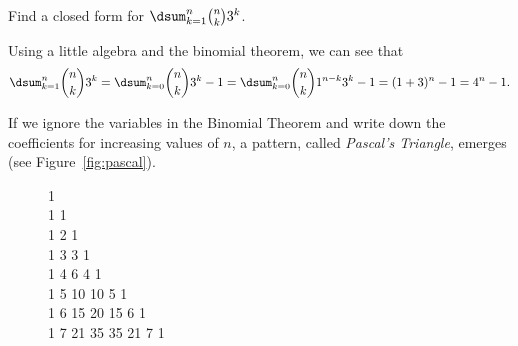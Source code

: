\begin{exer}
Find a closed form for $\dsum_{k=1}^{n} \binom{n}{k}3^k$.
\vspace*{2in}
\begin{answer}
Using a little algebra and the binomial theorem,  we can see that 
$$\dsum_{k=1}^{n} \binom{n}{k}3^k
=\dsum_{k=0}^{n} \binom{n}{k}3^{k}-1
=\dsum_{k=0}^{n} \binom{n}{k}1^{n-k}3^{k}-1
=(1+3)^{n}-1=4^n-1.$$
\end{answer}
\end{exer}

If we ignore the variables in the Binomial Theorem and write down the coefficients
for increasing values of $n$, a pattern, called {\em Pascal's Triangle}, emerges
(see Figure~\ref{fig:pascal}).

\begin{figure}[h]
\centering
\small{1 \\
1 \hspace{3mm} 1\\
1 \hspace{3mm} 2 \hspace{3mm} 1 \\
1 \hspace{3mm} 3 \hspace{3mm} 3 \hspace{3mm} 1 \\
1 \hspace{3mm} 4 \hspace{3mm} 6 \hspace{3mm} 4 \hspace{3mm} 1 \\
1 \hspace{3mm} 5 \hspace{3mm} 10 \hspace{3mm} 10 \hspace{3mm} 5 \hspace{3mm} 1 \\
1 \hspace{3mm} 6 \hspace{3mm} 15 \hspace{3mm} 20 \hspace{3mm} 15 \hspace{3mm} 6 \hspace{3mm} 1 \\
1 \hspace{3mm} 7 \hspace{3mm} 21 \hspace{3mm} 35 \hspace{3mm} 35 \hspace{3mm} 21 \hspace{3mm} 7 \hspace{3mm} 1 \\
}
\end{figure}
